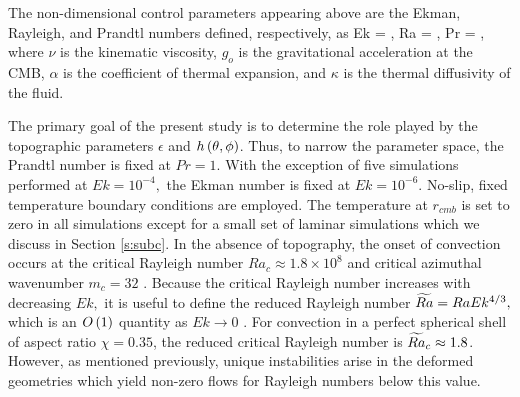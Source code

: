 The non-dimensional control parameters appearing above are the Ekman, Rayleigh, and Prandtl numbers defined, respectively, as
\be
Ek = ,\;\; Ra = , \;\; Pr = \frac{\nu}{\kappa},
\ee
where $\nu$ is the kinematic viscosity, $g_o$ is the gravitational acceleration at the CMB, $\alpha$ is the coefficient of thermal expansion, and $\kappa$ is the thermal diffusivity of the fluid. 



The primary goal of the present study is to determine the role played by the topographic parameters $\epsilon $ and $h\left ( \theta,\phi\right ) $. Thus, to narrow the parameter space, the Prandtl number is fixed at $Pr = 1$. 
With the exception of five simulations performed at $Ek = 10^{-4},$ the Ekman number is fixed at $Ek = 10^{-6}.$ 
No-slip, fixed temperature boundary conditions are employed. The temperature at $r_{cmb}$ is set to zero in all simulations except for a small set of laminar simulations which we discuss in Section \ref{s:subc}. 
In the absence of topography, the onset of convection occurs at the critical Rayleigh number $Ra_c \approx 1.8\times 10^8$ and critical azimuthal wavenumber $m_c = 32$ \citep[e.g.][]{aB22}. 
Because the critical Rayleigh number increases with decreasing $Ek,$ it is useful to define the reduced Rayleigh number
$\widetilde{Ra} = Ra Ek^{4/3},$ 
which is an $O\left ( 1\right ) $ quantity as $Ek\rightarrow0$ \citep[e.g.][]{eD04}. For convection in a perfect spherical shell of aspect ratio $\chi = 0.35$, the reduced critical Rayleigh number is $\widetilde{Ra}_{c} \approx 1.8$. 
However, as mentioned previously, unique instabilities arise in the deformed geometries which yield non-zero flows for Rayleigh numbers below this value. 

